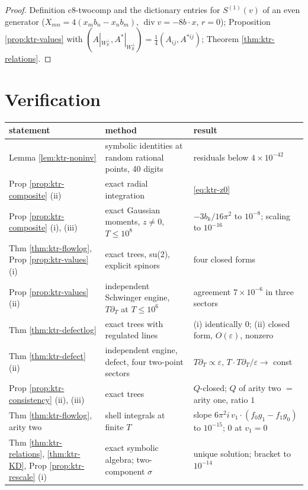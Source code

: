 \begin{proof}
Definition c8-twocomp and the dictionary entries for $S^{(1)}(v)$ of an even generator ($X_{mn}=4(x_mb_n-x_nb_m)$, $\operatorname{div}v=-8b\cdot x$, $r=0$); Proposition \ref{prop:ktr-values} with $(A|_{W_{\mathbb R}^\perp},A^*|_{W_{\mathbb R}^\perp})=\tfrac14(A_{ij},A^{*ij})$; Theorem \ref{thm:ktr-relations}.
\end{proof}

\section{Verification}

\begin{tabular}{l|l|l}
statement & method & result \\
\hline
Lemma \ref{lem:ktr-noninv} & symbolic identities at random rational points, 40 digits & residuals below $4\times10^{-42}$ \\
Prop \ref{prop:ktr-composite} (ii) & exact radial integration & \eqref{eq:ktr-z0} \\
Prop \ref{prop:ktr-composite} (i), (iii) & exact Gaussian moments, $z\neq0$, $T\le10^8$ & $-3b_k/16\pi^2$ to $10^{-8}$; scaling to $10^{-16}$ \\
Thm \ref{thm:ktr-flowlog}, Prop \ref{prop:ktr-values} (i) & exact trees, su(2), explicit spinors & four closed forms \\
Prop \ref{prop:ktr-values} (ii) & independent Schwinger engine, $T\partial_T$ at $T\le10^6$ & agreement $7\times10^{-6}$ in three sectors \\
Thm \ref{thm:ktr-defectlog} & exact trees with regulated lines & (i) identically $0$; (ii) closed form, $O(\varepsilon)$, nonzero \\
Thm \ref{thm:ktr-defect} (ii) & independent engine, defect, four two-point sectors & $T\partial_T\propto\varepsilon$, $T\cdot T\partial_T/\varepsilon\to$ const \\
Prop \ref{prop:ktr-consistency} (ii), (iii) & exact trees & $Q$-closed; $Q$ of arity two $=$ arity one, ratio $1$ \\
Thm \ref{thm:ktr-flowlog}, arity two & shell integrals at finite $T$ & slope $6\pi^2i\,v_1\cdot(f_0g_1-f_1g_0)$ to $10^{-15}$; $0$ at $v_1=0$ \\
Thm \ref{thm:ktr-relations}, \ref{thm:ktr-KD}, Prop \ref{prop:ktr-rescale} (i) & exact symbolic algebra; two-component $\sigma$ & unique solution; bracket to $10^{-14}$ \\
\end{tabular}
